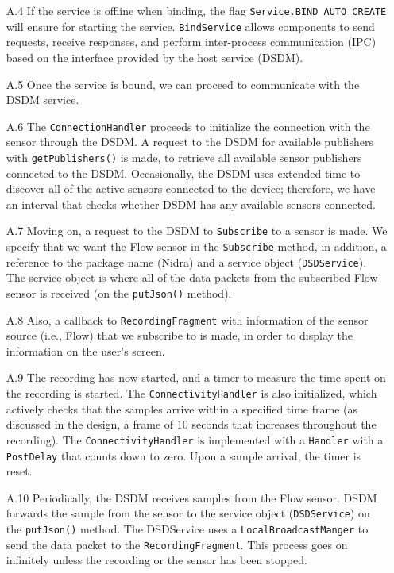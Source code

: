 \begin{itemize}
    \item[A.4] If the service is offline when binding, the flag \verb|Service.BIND_AUTO_CREATE| will ensure for starting the service. \verb|BindService| allows components to send requests, receive responses, and perform inter-process communication (IPC) based on the interface provided by the host service (DSDM). 
    \item[A.5] Once the service is bound, we can proceed to communicate with the DSDM service. 
       \item[A.6] The \verb|ConnectionHandler| proceeds to initialize the connection with the sensor through the DSDM.  A request to the DSDM for available publishers with \verb|getPublishers()| is made, to retrieve all available sensor publishers connected to the DSDM. Occasionally, the DSDM uses extended time to discover all of the active sensors connected to the device; therefore, we have an interval that checks whether DSDM has any available sensors connected. 
    \item[A.7] Moving on,  a request to the DSDM to \verb|Subscribe| to a sensor is made. We specify that we want the Flow sensor in the \verb|Subscribe| method, in addition, a reference to the package name (Nidra) and a service object (\verb|DSDService|). The service object is where all of the data packets from the subscribed Flow sensor is received (on the \verb|putJson()| method).   
    \item[A.8] Also, a callback to \verb|RecordingFragment| with information of the sensor source (i.e., Flow) that we subscribe to is made, in order to display the information on the user's screen. 
    \item[A.9] The recording has now started, and a timer to measure the time spent on the recording is started. The \verb|ConnectivityHandler| is also initialized, which actively checks that the samples arrive within a specified time frame (as discussed in the design, a frame of 10 seconds that increases throughout the recording). The \verb|ConnectivityHandler| is implemented with a \verb|Handler| with a \verb|PostDelay| that counts down to zero. Upon a sample arrival, the timer is reset. 
    \item[A.10] Periodically, the DSDM receives samples from the Flow sensor. DSDM forwards the sample from the sensor to the service object (\verb|DSDService|) on the \verb|putJson()| method. The DSDService uses a \verb|LocalBroadcastManger| to send the data packet to the \verb|RecordingFragment|. This process goes on infinitely unless the recording or the sensor has been stopped. 

\end{itemize}

